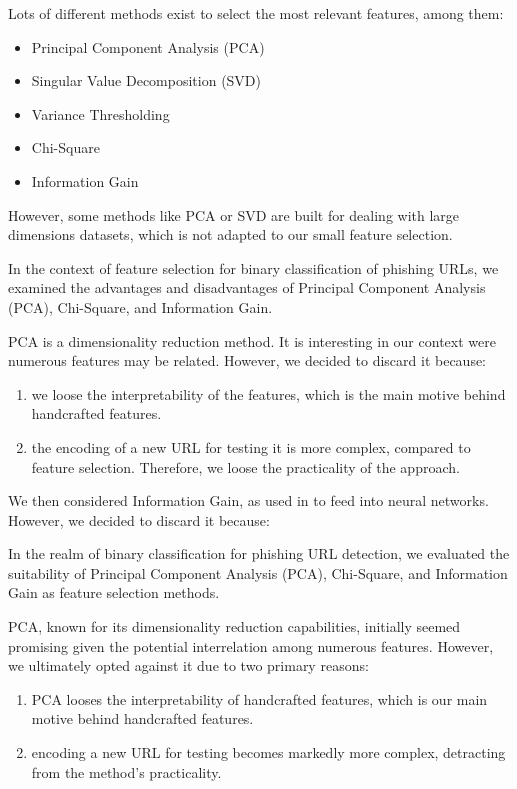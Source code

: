 \documentclass{article}
\begin{document}
    Lots of different methods exist to select the most relevant features, among them:
    \begin{itemize}
        \item Principal Component Analysis (PCA)
        \item Singular Value Decomposition (SVD)
        \item Variance Thresholding
        \item Chi-Square
        \item Information Gain
    \end{itemize}

    However, some methods like PCA or SVD are built for dealing with large dimensions datasets, which is not adapted to our small feature selection.

    In the context of feature selection for binary classification of phishing URLs, we examined the advantages and disadvantages of Principal Component Analysis (PCA), Chi-Square, and Information Gain.

    PCA is a dimensionality reduction method.
    It is interesting in our context were numerous features may be related.
    However, we decided to discard it because:
    \begin{enumerate}
        \item we loose the interpretability of the features, which is the main motive behind handcrafted features.
        \item the encoding of a new URL for testing it is more complex, compared to feature selection.
        Therefore, we loose the practicality of the approach.
    \end{enumerate}

    We then considered Information Gain, as used in\cite{EfficientDeepLearningPhishingDetection} to feed into neural networks.
    However, we decided to discard it because:

    In the realm of binary classification for phishing URL detection, we evaluated the suitability of Principal Component Analysis (PCA), Chi-Square, and Information Gain as feature selection methods.

    PCA, known for its dimensionality reduction capabilities, initially seemed promising given the potential interrelation among numerous features.
    However, we ultimately opted against it due to two primary reasons:
    \begin{enumerate}
        \item PCA looses the interpretability of handcrafted features, which is our main motive behind handcrafted features.
        \item encoding a new URL for testing becomes markedly more complex, detracting from the method's practicality.
    \end{enumerate}
\end{document}
